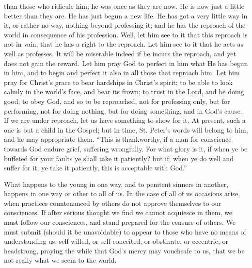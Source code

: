 than those who ridicule him; he was once as they are now. He is now
just a little better than they are. He has just begun a new life. He
has got a very little way in it, or rather no way, nothing beyond
professing it; and he has the reproach of the world in consequence of
his profession. Well, let him see to it that this reproach is not in
vain, that he has a right to the reproach. Let him see to it that he
acts as well as professes. It will be miserable indeed if he incurs
the reproach, and yet does not gain the reward. Let him pray God to
perfect in him what He has begun in him, and to begin and perfect it
also in all those that reproach him. Let him pray for Christ's grace
to bear hardships in Christ's spirit; to be able to look calmly in the
world's face, and bear its frown; to trust in the Lord, and be doing
good; to obey God, and so to be reproached, not for professing only,
but for performing, not for doing nothing, but for doing something,
and in God's cause. If we are under reproach, let us have something to
show for it. At present, such a one is but a child in the Gospel; but
in time, St. Peter's words will belong to him, and he may appropriate
them. ``This is thankworthy, if a man for conscience towards God
endure grief, suffering wrongfully. For what glory is it, if when ye
be buffeted for your faults ye shall take it patiently? but if, when
ye do well and suffer for it, ye take it patiently, this is acceptable
with God.''

What happens to the young in one way, and to penitent sinners in
another, happens in one way or other to all of us. In the case of all
of us occasions arise, when practices countenanced by others do not
approve themselves to our consciences. If after serious thought we
find we cannot acquiesce in them, we must follow our consciences, and
stand prepared for the censure of others. We must submit (should it be
unavoidable) to appear to those who have no means of understanding us,
self-willed, or self-conceited, or obstinate, or eccentric, or
headstrong, praying the while that God's mercy may vouchsafe to us,
that we be not really what we seem to the world.

